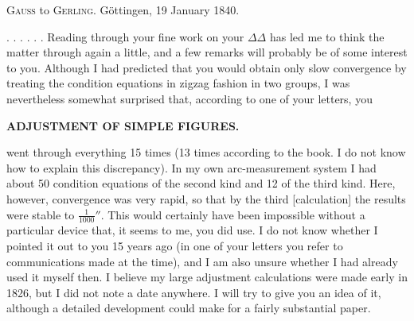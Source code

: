 \bigskip
{\centering
\textsc{Gauss} to \textsc{Gerling}. \quad Göttingen, 19 January 1840.\par}
\medskip

. . . . . . Reading through your fine work on your \(\Delta\Delta\) has led me to think the matter through again a little, and a few remarks will probably be of some interest to you. Although I had predicted that you would obtain only slow convergence by treating the condition equations in zigzag fashion in two groups, I was nevertheless somewhat surprised that, according to one of your letters, you

\par\clearpage
\noindent\null\hfill{\small\textbf{ADJUSTMENT OF SIMPLE FIGURES.}}\hfill{}\par\medskip

\noindent went through everything 15 times (13 times according to the book. I do not know how to explain this discrepancy). In my own arc-measurement system I had about 50 condition equations of the second kind and 12 of the third kind. Here, however, convergence was very rapid, so that by the third [calculation] the results were stable to \(\frac{1}{1000}''\). This would certainly have been impossible without a particular device that, it seems to me, you did  use. I do not know whether I pointed it out to you 15 years ago (in one of your letters you refer to communications made at the time), and I am also unsure whether I had already used it myself then. I believe my large adjustment calculations were made early in 1826, but I did not note a date anywhere. I will try to give you an idea of it, although a detailed development could make for a fairly substantial paper.

